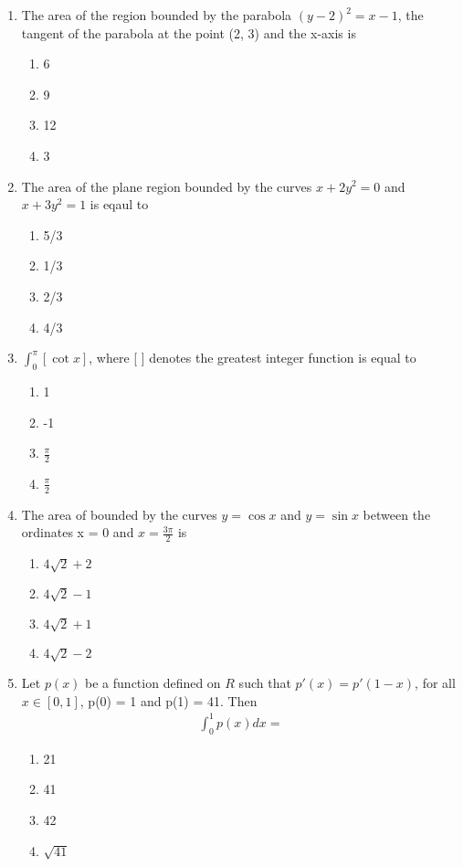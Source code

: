 \begin{enumerate}[label=\arabic*.,ref=\thesubsection.\theenumi]
\item The area of the region bounded by the parabola $(y - 2)^2 = x - 1$, the tangent of the parabola at the point
(2, 3) and the x-axis is
\begin{enumerate}
\item 6
\item 9
\item 12
\item 3
\end{enumerate}

\item The area of the plane region bounded by the curves $x + 2y^2 = 0$ and $x + 3y^2 = 1$ is eqaul to
\begin{enumerate}
\item 5/3
\item 1/3
\item 2/3
\item 4/3
\end{enumerate}

\item $\int_{0}^{\pi}[\cot x]$, where [ ] denotes the greatest integer function is equal to
\begin{enumerate}
\item 1
\item -1
\item $\frac{\pi}{2}$
\item $\frac{\pi}{2}$
\end{enumerate}

\item The area of bounded by the curves $y = \cos x$ and $y = \sin x$ between the ordinates x = 0 and $x = \frac{3\pi}{2} $ is
\begin{enumerate}
\item $4\sqrt{2} + 2$
\item $4\sqrt{2} - 1$
\item $4\sqrt{2} + 1$
\item $4\sqrt{2} - 2$
\end{enumerate}

\item Let $p(x)$ be a function defined on $R$ such that $p'(x) = p'(1 - x)$, for all $x \in [0, 1]$, p(0) = 1 and p(1) = 41. Then
\begin{align*}
\int_{0}^{1}p(x)dx = 
\end{align*}
\begin{enumerate}
\item 21
\item 41
\item 42
\item $\sqrt{41}$
\end{enumerate}


\end{enumerate}

